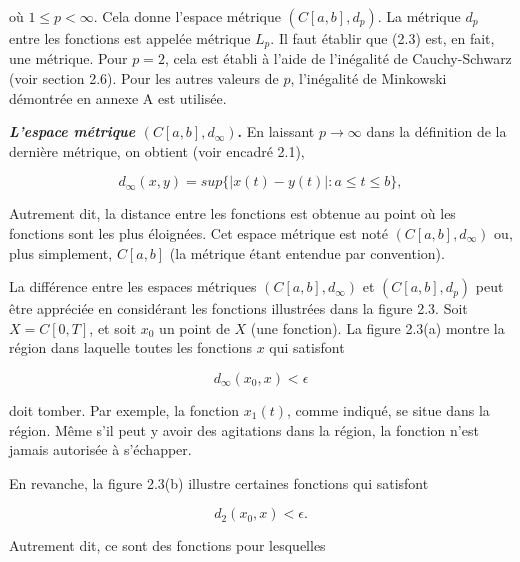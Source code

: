 \documentclass[10pt,twoside,a4paper]{book}
\begin{document}
\noindent
où $1 \leq p < \infty$. Cela donne l'espace métrique $(C[a, b], d_p)$. La métrique $d_p$ entre les fonctions est appelée métrique $L_p$. Il faut établir que (2.3) est, en fait, une métrique. Pour $p = 2$, cela est établi à l'aide de l'inégalité de Cauchy-Schwarz (voir section 2.6). 
Pour les autres valeurs de $p$, l'inégalité de Minkowski démontrée en annexe A est utilisée.

\vspace{4mm}
\noindent
\textbf{\textit{L'espace métrique} $(C[a, b], d_\infty)$.} En laissant $p \longrightarrow \infty$ dans la définition de la dernière métrique, on obtient (voir encadré 2.1),

\begin{equation}
  d_\infty(x, y) = sup\{|x(t) - y(t)| : a \leq t \leq b\} ,
\end{equation}

\noindent
Autrement dit, la distance entre les fonctions est obtenue au point où les fonctions sont les plus éloignées. Cet espace métrique est noté $(C[a, b], d_\infty)$ ou, plus simplement, $C[a, b]$ (la métrique étant entendue par convention).

La différence entre les espaces métriques $(C[a, b], d_\infty)$ et $(C[a, b], d_p)$ peut être appréciée en considérant les fonctions illustrées dans la figure 2.3. Soit $X = C[0, T]$, et soit $x_0$ un point de $X$ (une fonction). 
La figure 2.3(a) montre la région dans laquelle toutes les fonctions $x$ qui satisfont

\begin{equation*}
  d_\infty(x_0, x) < \epsilon
\end{equation*}


\noindent
doit tomber. Par exemple, la fonction $x_1(t)$, comme indiqué, se situe dans la région. Même s'il peut y avoir des agitations dans la région, la fonction n'est jamais autorisée à s'échapper.

En revanche, la figure 2.3(b) illustre certaines fonctions qui satisfont

\begin{equation*}
  d_2(x_0, x) < \epsilon.
\end{equation*}

\noindent
Autrement dit, ce sont des fonctions pour lesquelles
\end{document}
